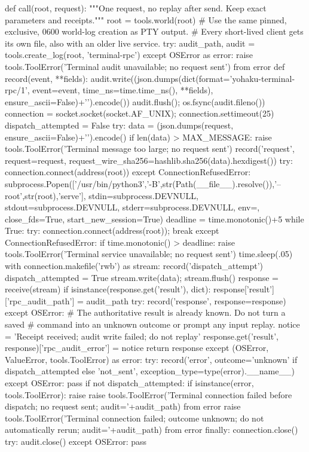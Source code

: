 def call(root, request):
    """One request, no replay after send. Keep exact parameters and receipts."""
    root = tools.world(root)
    # Use the same pinned, exclusive, 0600 world-log creation as PTY output.
    # Every short-lived client gets its own file, also with an older live service.
    try:
        audit_path, audit = tools.create_log(root, 'terminal-rpc')
    except OSError as error:
        raise tools.ToolError('Terminal audit unavailable; no request sent') from error
    def record(event, **fields):
        audit.write((json.dumps(dict(format='yohaku-terminal-rpc/1',
            event=event, time_ns=time.time_ns(), **fields), ensure_ascii=False)+'\n').encode())
        audit.flush(); os.fsync(audit.fileno())
    connection = socket.socket(socket.AF_UNIX); connection.settimeout(25)
    dispatch_attempted = False
    try:
        data = (json.dumps(request, ensure_ascii=False)+'\n').encode()
        if len(data) > MAX_MESSAGE: raise tools.ToolError('Terminal message too large; no request sent')
        record('request', request=request, request_wire_sha256=hashlib.sha256(data).hexdigest())
        try: connection.connect(address(root))
        except ConnectionRefusedError:
            subprocess.Popen(['/usr/bin/python3','-B',str(Path(__file__).resolve()),'--root',str(root),'serve'],
                stdin=subprocess.DEVNULL, stdout=subprocess.DEVNULL, stderr=subprocess.DEVNULL,
                env={}, close_fds=True, start_new_session=True)
            deadline = time.monotonic()+5
            while True:
                try: connection.connect(address(root)); break
                except ConnectionRefusedError:
                    if time.monotonic() > deadline: raise tools.ToolError('Terminal service unavailable; no request sent')
                    time.sleep(.05)
        with connection.makefile('rwb') as stream:
            record('dispatch_attempt')
            dispatch_attempted = True
            stream.write(data); stream.flush()
            response = receive(stream)
            if isinstance(response.get('result'), dict):
                response['result']['rpc_audit_path'] = audit_path
            try:
                record('response', response=response)
            except OSError:
                # The authoritative result is already known. Do not turn a saved
                # command into an unknown outcome or prompt any input replay.
                notice = 'Receipt received; audit write failed; do not replay'
                response.get('result', response)['rpc_audit_error'] = notice
            return response
    except (OSError, ValueError, tools.ToolError) as error:
        try:
            record('error', outcome='unknown' if dispatch_attempted else 'not_sent',
                exception_type=type(error).__name__)
        except OSError: pass
        if not dispatch_attempted:
            if isinstance(error, tools.ToolError): raise
            raise tools.ToolError('Terminal connection failed before dispatch; no request sent; audit='+audit_path) from error
        raise tools.ToolError('Terminal connection failed; outcome unknown; do not automatically rerun; audit='+audit_path) from error
    finally:
        connection.close()
        try: audit.close()
        except OSError: pass


